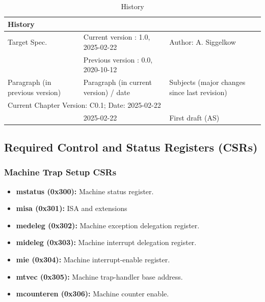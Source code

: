 \begin{table}[H]
	\caption{History}
	\label{tab:arch_history03}
	\centering
	\begin{tabularx}{\textwidth}{|X |X |X |}
	  \hline
	  \multicolumn{3}{|l|}{History} \\
	  \hline
	  \multicolumn{1}{|l}{Target Spec.} & \multicolumn{1}{l}{Current version : 1.0, 2025-02-22} & \multicolumn{1}{l|}{Author: A. Siggelkow}\\
	  \multicolumn{1}{|l}{ } & \multicolumn{1}{l}{Previous version : 0.0, 2020-10-12} & \multicolumn{1}{l|}{ }\\
	  \hline
	  \hline
	  Paragraph (in previous version) & Paragraph (in current version) / date & Subjects (major changes since last revision) \\
	  \hline
	  \hline
	  \multicolumn{3}{|l|}{Current Chapter Version: C0.1; Date: 2025-02-22} \\
	  \hline
	  & 2025-02-22 & First draft (AS) \\
	  \hline
	\end{tabularx}
\end{table}

\subsection{Required Control and Status Registers (CSRs)}
	
	\subsubsection{Machine Trap Setup CSRs}
		\begin{itemize}
			\item \textbf{mstatus (0x300):} Machine status register.
			\item \textbf{misa (0x301):} ISA and extensions
			\item \textbf{medeleg (0x302):} Machine exception delegation register.
			\item \textbf{mideleg (0x303):} Machine interrupt delegation register.
			\item \textbf{mie (0x304):} Machine interrupt-enable register.
			\item \textbf{mtvec (0x305):} Machine trap-handler base address.
			\item \textbf{mcounteren (0x306):} Machine counter enable.
		\end{itemize}
	
